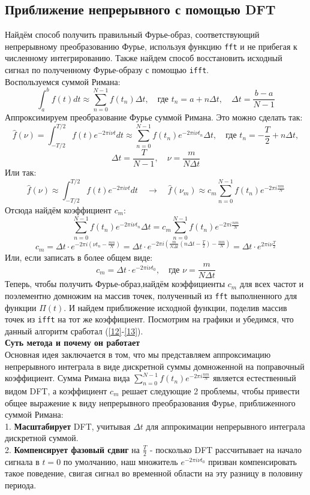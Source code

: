 \subsection{Приближение непрерывного с помощью DFT}
Найдём способ получить правильный Фурье-образ, соответствующий непрерывному преобразованию Фурье, используя функцию \texttt{fft} и не прибегая к численному
интегрированию. Также найдем способ восстановить исходный сигнал по полученному Фурье-образу с помощью \texttt{ifft}.\\
Воспользуемся суммой Римана:
$$
\int_a^b f(t) dt \approx \sum_{n=0}^{N-1} f(t_n) \Delta t, \quad \text{где } t_n = a + n \Delta t, \quad \Delta t = \frac{b-a}{N-1}
$$
Аппроксимируем преобразование Фурье суммой Римана. Это можно сделать так:
$$
\hat{f}(\nu)=\int_{-T/2}^{T/2}f(t)e^{-2\pi i\nu t}dt\approx\sum_{n=0}^{N-1}f(t_n)e^{-2\pi i\nu t_n}\Delta t,\quad\text{где } t_n=-\frac{T}{2}+n\Delta t,
$$
$$
\Delta t=\frac{T}{N-1},\quad\nu=\frac{m}{N\Delta t}
$$
Или так:
$$
\hat{f}(\nu) \approx \int_{-T/2}^{T/2} f(t) e^{-2\pi i \nu t}  
dt \quad \rightarrow \quad \hat{f}(\nu_m) \approx c_m \sum_{n=0}^{N-1} f(t_n) e^{-2\pi i \frac{nm}{N}}
$$
Отсюда найдём коэффициент $c_m$:
$$
\sum_{n=0}^{N-1}f(t_n)e^{-2\pi i\nu t_n}\Delta t=c_m\sum_{n=0}^{N-1} f(t_n) e^{-2\pi i \frac{nm}{N}}
$$
$$
c_m=\Delta t \cdot e^{-2\pi i\left(\nu t_n-\frac{mn}{N}\right)}=
\Delta t \cdot e^{-2\pi i\left(\frac{m}{N\Delta t} \left(n\Delta t-\frac{T}{2}\right)-\frac{mn}{N}\right)}=
\Delta t \cdot e^{2\pi i\nu\frac{T}{2}}
$$
Или, если записать в более общем виде:
$$
c_m=\Delta t\cdot e^{-2\pi i\nu t_0},\quad\text{где }\nu=\frac{m}{N\Delta t}
$$
Теперь, чтобы получить Фурье-образ,найдём коэффициенты $c_m$ для всех частот и поэлементно домножим на массив точек, полученный из \texttt{fft} выполненного
для функции $\Pi(t)$. И найдем приближение исходной функции, поделив массив точек из \texttt{ifft} на тот же коэффициент. Посмотрим на графики и убедимся, что данный алгоритм сработал 
(\ref{12}-\ref{13}).\\
\textbf{Суть метода и почему он работает}\\
Основная идея заключается в том, что мы представляем аппроксимацию непрерывного интеграла в виде дискретной суммы домноженной на поправочный коэффициент.
Сумма Римана вида $\sum_{n=0}^{N-1} f(t_n) e^{-2\pi i \frac{nm}{N}}$ является естественный видом DFT, а коэффициент $c_m$ решает следующие 2 проблемы,
чтобы привести общее выражение к виду непрерывного преобразования Фурье, приближенного суммой Римана:\\
1. \textbf{Масштабирует} DFT, учитывая $\Delta t$ для аппрокимации непрерывного интеграла дискретной суммой.
\\
2. \textbf{Компенсирует фазовый сдвиг} на $\frac{T}{2}$ - посколько DFT рассчитывает на начало сигнала в $t=0$ по умолчанию, наш множитель
$e^{-2\pi i\nu t_0}$ призван компенсировать такое поведение, свигая сигнал во временной области на эту разницу в половину периода.

